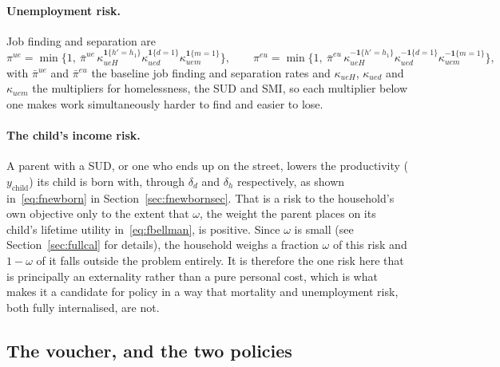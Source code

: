 \documentclass[10pt]{article}
\begin{document}
\paragraph{Unemployment risk.} Job finding and separation are
\begin{equation}\label{eq:femp}
\pi^{ue}=\min\Big\{1,\ \bar\pi^{ue}\,\kappa_{ueH}^{\mathbf{1}\{h'=h_1\}}
\kappa_{ued}^{\mathbf{1}\{d=1\}}\kappa_{uem}^{\mathbf{1}\{m=1\}}\Big\},
\qquad
\pi^{eu}=\min\Big\{1,\ \bar\pi^{eu}\,\kappa_{ueH}^{-\mathbf{1}\{h'=h_1\}}
\kappa_{ued}^{-\mathbf{1}\{d=1\}}\kappa_{uem}^{-\mathbf{1}\{m=1\}}\Big\},
\end{equation}
with $\bar\pi^{ue}$ and $\bar\pi^{eu}$ the baseline job finding and
separation rates and $\kappa_{ueH}$, $\kappa_{ued}$ and $\kappa_{uem}$ the
multipliers for homelessness, the SUD and SMI, so each multiplier
below one makes work simultaneously harder to find and easier to lose.

\paragraph{The child's income risk.}
A parent with a SUD, or one who ends up on the street, lowers the
productivity ($y_{\text{child}}$) its
child is born with, through $\delta_d$ and $\delta_h$ respectively, as shown
in~\eqref{eq:fnewborn} in Section~\ref{sec:fnewbornsec}. That is a risk to the
household's own objective only
to the extent that $\omega$, the weight the parent places on its child's
lifetime utility in~\eqref{eq:fbellman}, is positive. Since $\omega$ is
small (see Section~\ref{sec:fullcal} for details), the
household weighs a fraction $\omega$ of this risk and $1-\omega$ of it falls
outside the problem entirely. It is therefore the one risk here that is
principally an externality rather than a pure personal cost, which is what makes it a
candidate for policy in a way that mortality and unemployment risk, both fully
internalised, are not.

\subsection{The voucher, and the two policies}
\end{document}
